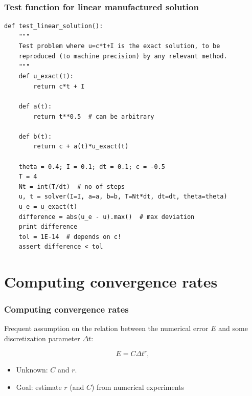 \documentclass{beamer}
\begin{document}
\begin{frame}
\frametitle{Test function for linear manufactured solution}

\begin{verbatim}
def test_linear_solution():
    """
    Test problem where u=c*t+I is the exact solution, to be
    reproduced (to machine precision) by any relevant method.
    """
    def u_exact(t):
        return c*t + I

    def a(t):
        return t**0.5  # can be arbitrary

    def b(t):
        return c + a(t)*u_exact(t)

    theta = 0.4; I = 0.1; dt = 0.1; c = -0.5
    T = 4
    Nt = int(T/dt)  # no of steps
    u, t = solver(I=I, a=a, b=b, T=Nt*dt, dt=dt, theta=theta)
    u_e = u_exact(t)
    difference = abs(u_e - u).max()  # max deviation
    print difference
    tol = 1E-14  # depends on c!
    assert difference < tol
\end{verbatim}
\end{frame}

\section{Computing convergence rates}

\begin{frame}
\frametitle{Computing convergence rates}

\label{decay:convrates}

Frequent assumption on the relation between the numerical error $E$ and
some discretization parameter $\Delta t$:

\begin{equation}
E = C\Delta t^r,
\label{decay:E:dt}
\end{equation}

\begin{itemize}
 \item Unknown: $C$ and $r$.

 \item Goal: estimate $r$ (and $C$) from numerical experiments
\end{itemize}

\noindent

\end{frame}
\end{document}
